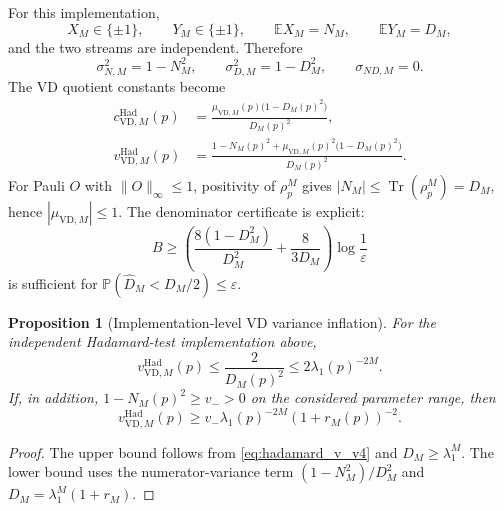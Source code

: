 \documentclass[11pt]{article}
\newtheorem{proposition}{Proposition}
\DeclareMathOperator{\Tr}{Tr}
\newcommand{\E}{\mathbb{E}}
\newcommand{\Prob}{\mathbb{P}}
\newcommand{\1}{\mathbf{1}}
\newcommand{\abs}[1]{\left\lvert #1 \right\rvert}
\begin{document}
For this implementation,
\begin{equation}
    X_M\in\{\pm1\},
    \qquad
    Y_M\in\{\pm1\},
    \qquad
    \E X_M=N_M,
    \qquad
    \E Y_M=D_M,
\end{equation}
and the two streams are independent.  Therefore
\begin{equation}
    \sigma_{N,M}^2=1-N_M^2,
    \qquad
    \sigma_{D,M}^2=1-D_M^2,
    \qquad
    \sigma_{ND,M}=0.
    \label{eq:hadamard_variances_v4}
\end{equation}
The VD quotient constants become
\begin{align}
    c_{\mathrm{VD},M}^{\mathrm{Had}}(p)
    &=\frac{\mu_{\mathrm{VD},M}(p)\bigl(1-D_M(p)^2\bigr)}{D_M(p)^2},
    \label{eq:hadamard_c_v4}\\
    v_{\mathrm{VD},M}^{\mathrm{Had}}(p)
    &=\frac{1-N_M(p)^2+\mu_{\mathrm{VD},M}(p)^2\bigl(1-D_M(p)^2\bigr)}{D_M(p)^2}.
    \label{eq:hadamard_v_v4}
\end{align}
For Pauli \(O\) with \(\|O\|_\infty\le1\), positivity of \(\rho_p^M\) gives \(\abs{N_M}\le \Tr(\rho_p^M)=D_M\), hence \(\abs{\mu_{\mathrm{VD},M}}\le1\).  The denominator certificate is explicit:
\begin{equation}
    B\geq
    \left(
    \frac{8(1-D_M^2)}{D_M^2}+\frac{8}{3D_M}
    \right)\log\!\frac1\varepsilon
    \label{eq:hadamard_Bmin_v4}
\end{equation}
is sufficient for \(\Prob(\widehat D_M<D_M/2)\leq\varepsilon\).

\begin{proposition}[Implementation-level VD variance inflation]
\label{prop:implementation_variance_inflation_v4}
For the independent Hadamard-test implementation above,
\begin{equation}
    v_{\mathrm{VD},M}^{\mathrm{Had}}(p)
    \leq \frac{2}{D_M(p)^2}
    \leq 2\lambda_1(p)^{-2M}.
    \label{eq:implementation_upper_v4}
\end{equation}
If, in addition, \(1-N_M(p)^2\geq v_->0\) on the considered parameter range, then
\begin{equation}
    v_{\mathrm{VD},M}^{\mathrm{Had}}(p)\geq v_-\lambda_1(p)^{-2M}(1+r_M(p))^{-2}.
    \label{eq:implementation_lower_v4}
\end{equation}
\end{proposition}

\begin{proof}
The upper bound follows from \cref{eq:hadamard_v_v4} and \(D_M\geq\lambda_1^M\).  The lower bound uses the numerator-variance term \((1-N_M^2)/D_M^2\) and \(D_M=\lambda_1^M(1+r_M)\).
\end{proof}
\end{document}
